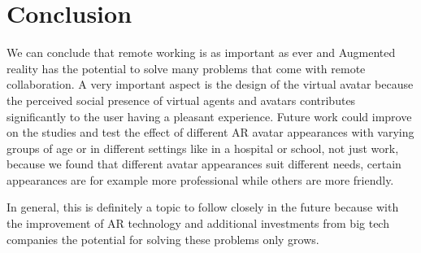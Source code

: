 \chapter{Conclusion}
We can conclude that remote working is as important as ever and Augmented reality has the potential to solve many problems that come with remote collaboration. A very important aspect is the design of the virtual avatar because the perceived social presence of virtual agents and avatars contributes significantly to the user having a pleasant experience.
Future work could improve on the studies and test the effect of different AR avatar appearances with varying groups of age or in different settings like in a hospital or school, not just work, because we found that different avatar appearances suit different needs, certain appearances are for example more professional while others are more friendly.

In general, this is definitely a topic to follow closely in the future because with the improvement of AR technology and additional investments from big tech companies the potential for solving these problems only grows.